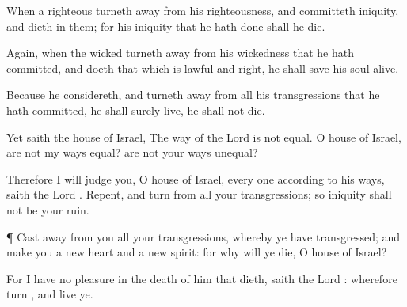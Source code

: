{When a
righteous
{} turneth
away from his
righteousness, and
committeth
iniquity, and
dieth in them; for his
iniquity that he hath
done shall he
die.

Again, when the
wicked
{} turneth
away from his
wickedness that he hath
committed, and
doeth that which is
lawful and
right, he shall
save his
soul
alive.

Because he
considereth, and turneth
away from all his
transgressions that he hath
committed, he shall
surely
live, he shall not
die.

Yet
saith the
house of
Israel, The
way of the
Lord is not
equal. O
house of
Israel, are not my
ways
equal? are not your
ways
unequal?


\par }{\PP {}Therefore I will
judge you, O
house of
Israel, every
one according to his
ways,
saith the
Lord
{}.
Repent, and
turn
{} from all your
transgressions; so
iniquity shall not be your
ruin.


\par }{\PP {}¶ Cast
away from you all your
transgressions, whereby ye have
transgressed; and
make you a
new
heart and a
new
spirit: for why will ye
die, O
house of
Israel?

For I have no
pleasure in the
death of him that
dieth,
saith the
Lord
{}: wherefore
turn
{}, and
live ye.




\par }
